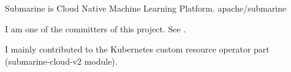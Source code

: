 

\begin{cventries}

  \cventry
    {Submarine is Cloud Native Machine Learning Platform.}
    {apache/submarine \href{https://github.com/apache/submarine}{\color{red}{[Github Link]}}}
    {}
    {} %
    {
      \begin{cvitems} %
        \item {I am one of the committers of this project. See \href{https://people.apache.org/phonebook.html?unix=submarine}{\color{red}{Apache committer index}}.}
        \item {I mainly contributed to the Kubernetes custom resource operator part (submarine-cloud-v2 module).}
      \end{cvitems}
    }

\end{cventries}
